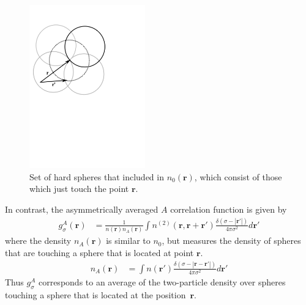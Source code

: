 \documentclass[letterpaper,twocolumn,amsmath,amssymb,jcp,10pt,aip]{revtex4-1}
\newcommand{\rr}{\textbf{r}}
\begin{document}
\begin{figure}
\includegraphics[width=5cm]{figs/n0}
\caption{Set of hard spheres that included in $n_0(\mathbf{r})$, which
  consist of those which just touch the point $\mathbf{r}$.}
\label{fig:n0}
\end{figure}

In contrast, the asymmetrically averaged $A$ correlation function is
given by
\begin{align}
  g^A_\sigma(\rr) &= \frac{1}{n(\rr)n_A(\rr)}
  \int n^{(2)}(\rr, \rr + \rr')
  \frac{\delta(\sigma -|\rr'|)}{4\pi\sigma^2}d\rr' \label{eq:gA}
\end{align}
where the density $n_A(\rr)$ is similar to $n_0$, but measures the
density of spheres that are touching a sphere that is located at
point $\rr$.
\begin{align}
  n_A(\rr) &= \int n(\rr')
  \frac{\delta(\sigma -|\rr-\rr'|)}{4\pi\sigma^2} d\rr' \label{eq:nA}
\end{align}
Thus $g_\sigma^A$ corresponds to an average of the two-particle
density over spheres touching a sphere that is located at the
position~$\rr$.

\end{document}
